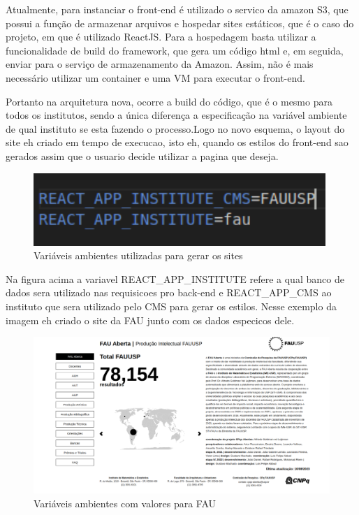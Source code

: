 \documentclass[12pt,twoside,english,brazilian]{article}
\begin{document}
Atualmente, para instanciar o front-end é utilizado o servico da amazon S3, que possui a função de armazenar arquivos e hospedar sites estáticos, que é o caso do projeto, em que é utilizado ReactJS.
Para a hospedagem basta utilizar a funcionalidade de build do framework, que gera um código html e, em seguida, enviar para o serviço de armazenamento da Amazon. Assim, não é mais necessário utilizar um container e uma VM para executar o front-end. 

Portanto na arquitetura nova, ocorre a build do código, que é o mesmo para todos os institutos, sendo a única diferença a especificação na variável ambiente de qual instituto se esta fazendo o processo.Logo no novo esquema, o layout do site eh criado em tempo de execucao, isto eh, quando os estilos do front-end sao gerados assim que o usuario decide utilizar a pagina que deseja.

\begin{figure}
    \centering
    \includegraphics[width=0.5\linewidth]{figuras/variaveis_ambiente.pdf}
    \caption{Variáveis  ambientes utilizadas para gerar os sites}
    \label{fig:arquitetura-nova}
\end{figure}

Na figura acima a variavel REACT\_APP\_INSTITUTE refere a qual banco de dados sera utilizado nas requisicoes pro back-end e REACT\_APP\_CMS ao instituto que sera utilizado pelo CMS para gerar os estilos. Nesse exemplo da imagem eh criado o site da FAU junto com os dados especicos dele.

\begin{figure}
    \centering
    \includegraphics[width=0.75\linewidth]{figuras/variaveis_ambiente_exFAU.pdf}
    \caption{Variáveis  ambientes com valores para FAU}
    \label{fig:arquitetura-nova}
\end{figure}
\end{document}
